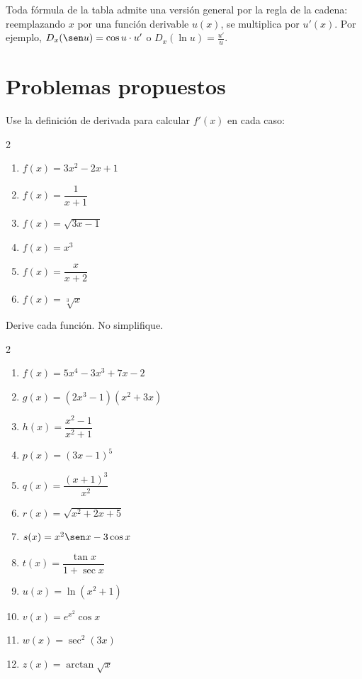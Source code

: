 \begin{rem}
Toda fórmula de la tabla admite una versión general por la regla de la
cadena: reemplazando $x$ por una función derivable $u(x)$, se multiplica
por $u'(x)$. Por ejemplo, $D_x(\sen u) = \cos u\cdot u'$ o
$D_x(\ln u) = \frac{u'}{u}$.
\end{rem}

\section{Problemas propuestos}

\begin{prob}
Use la definición de derivada para calcular $f'(x)$ en cada caso:
\begin{multicols}{2}
\begin{enumerate}
    \item $f(x) = 3x^2 - 2x + 1$
    \item $f(x) = \dfrac{1}{x+1}$
    \item $f(x) = \sqrt{3x-1}$
    \item $f(x) = x^3$
    \item $f(x) = \dfrac{x}{x+2}$
    \item $f(x) = \sqrt[3]{x}$
\end{enumerate}
\end{multicols}
\end{prob}

\begin{prob}
Derive cada función. No simplifique.
\begin{multicols}{2}
\begin{enumerate}
    \item $f(x) = 5x^4 - 3x^3 + 7x - 2$
    \item $g(x) = (2x^3-1)(x^2+3x)$
    \item $h(x) = \dfrac{x^2-1}{x^2+1}$
    \item $p(x) = (3x-1)^5$
    \item $q(x) = \dfrac{(x+1)^3}{x^2}$
    \item $r(x) = \sqrt{x^2+2x+5}$
    \item $s(x) = x^2\sen x - 3\cos x$
    \item $t(x) = \dfrac{\tan x}{1+\sec x}$
    \item $u(x) = \ln(x^2+1)$
    \item $v(x) = e^{x^2}\cos x$
    \item $w(x) = \sec^2(3x)$
    \item $z(x) = \arctan\!\sqrt{x}$
\end{enumerate}
\end{multicols}
\end{prob}

